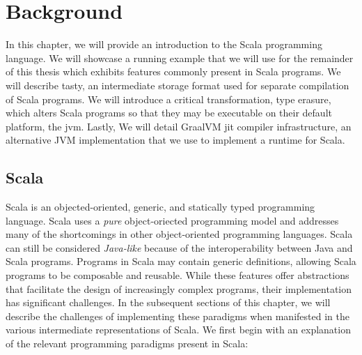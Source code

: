 \chapter{Background}

In this chapter, we will provide an introduction to the Scala programming language. 
We will showcase a running example that we will use for the remainder of this thesis which exhibits features commonly present in Scala programs. 
We will describe \acrfull{tasty}, an intermediate storage format used for separate compilation of Scala programs. 
We will introduce a critical transformation, type erasure, which alters Scala programs so that they may be executable on their default platform, the \acrfull{jvm}. 
Lastly, We will detail GraalVM \acrfull{jit} compiler infrastructure, an alternative JVM implementation that we use to implement a runtime for Scala.

\section{Scala}

Scala\cite{scala:overview} is an objected-oriented, generic, and statically typed programming language.
Scala uses a \textit{pure} object-oriected programming model\cite{smalltalk:design} and addresses many of the shortcomings\cite{go4:design-patterns} in other object-oriented programming languages.
Scala can still be considered \textit{Java-like} because of the interoperability between Java and Scala programs.
Programs in Scala may contain generic definitions, allowing Scala programs to be composable and reusable\cite{scala:origins}.
While these features offer abstractions that facilitate the design of increasingly complex programs, their implementation has significant challenges.
In the subsequent sections of this chapter, we will describe the challenges of implementing these paradigms when manifested in the various intermediate representations of Scala.
We first begin with an explanation of the relevant programming paradigms present in Scala:

